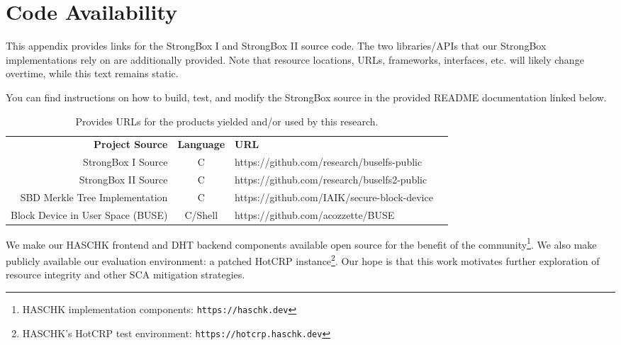 \renewcommand\thechapter{A}
\chapter{Code Availability} \label{app:availability}


This appendix provides links for the StrongBox I and StrongBox II source code.
The two libraries/APIs that our StrongBox implementations rely on are
additionally provided. Note that resource locations, URLs, frameworks,
interfaces, etc. will likely change overtime, while this text remains static.

You can find instructions on how to build, test, and modify the StrongBox source
in the provided README documentation linked below.

\begin{table}
    \centering
    \caption{Provides URLs for the products yielded and/or used by this research.}
    \begin{tabular}{|r|c|l|l}
        \cline{1-3}
        \textbf{Project Source} & \textbf{Language} & \textbf{URL} & \\
        \cline{1-3}
        StrongBox I Source & C & https://github.com/research/buselfs-public & \\
        StrongBox II Source & C & https://github.com/research/buselfs2-public & \\
        SBD Merkle Tree Implementation & C & https://github.com/IAIK/secure-block-device & \\
        Block Device in User Space (BUSE) & C/Shell & https://github.com/acozzette/BUSE & \\
        \cline{1-3}
    \end{tabular}
\end{table}





We make our HASCHK frontend and DHT backend components available open source
for the benefit of the community\footnote{HASCHK implementation components:
\texttt{https://haschk.dev}}. We also make publicly available our evaluation
environment: a patched HotCRP instance\footnote{HASCHK's HotCRP test
environment: \texttt{https://hotcrp.haschk.dev}}. Our hope is that this work
motivates further exploration of resource integrity and other SCA mitigation
strategies.
